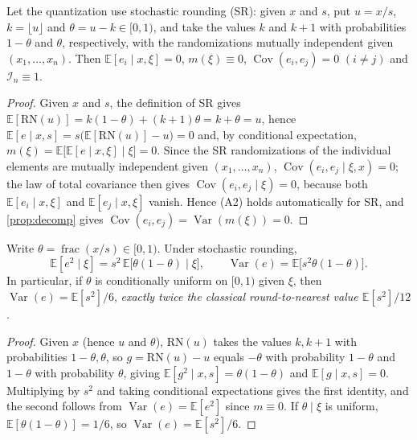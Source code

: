 \documentclass[review,hidelinks,oneeqnum,onetabnum,onefignum,onethmnum]{siamart251216}
\begin{document}
\begin{proposition}
\label{prop:sr}
Let the quantization use stochastic rounding (SR): given $x$ and $s$, put
$u=x/s$, $k=\lfloor u\rfloor$ and $\theta=u-k\in[0,1)$, and take the values
$k$ and $k+1$ with probabilities $1-\theta$ and $\theta$, respectively, with
the randomizations mutually independent given $(x_1,\dots,x_n)$. Then
$\mathbb{E}[e_i\mid x,\xi]=0$, $m(\xi)\equiv0$,
$\operatorname{Cov}(e_i,e_j)=0$ $(i\ne j)$ and $\mathcal I_n\equiv1$.
\end{proposition}

\begin{proof}
Given $x$ and $s$, the definition of SR gives
$\mathbb{E}[\mathrm{RN}(u)]=k(1-\theta)+(k+1)\theta=k+\theta=u$, hence
$\mathbb{E}[e\mid x,s]=s\bigl(\mathbb{E}[\mathrm{RN}(u)]-u\bigr)=0$ and, by
conditional expectation,
$m(\xi)=\mathbb{E}\bigl[\mathbb{E}[e\mid x,\xi]\mid\xi\bigr]=0$. Since the SR
randomizations of the individual elements are mutually independent given
$(x_1,\dots,x_n)$, $\operatorname{Cov}(e_i,e_j\mid\xi,x)=0$; the law of total
covariance then gives $\operatorname{Cov}(e_i,e_j\mid\xi)=0$, because both
$\mathbb{E}[e_i\mid x,\xi]$ and $\mathbb{E}[e_j\mid x,\xi]$ vanish. Hence (A2)
holds automatically for SR, and \cref{prop:decomp} gives
$\operatorname{Cov}(e_i,e_j)=\operatorname{Var}(m(\xi))=0$.
\end{proof}

\begin{corollary}
\label{cor:srvar}
Write $\theta=\operatorname{frac}(x/s)\in[0,1)$. Under stochastic rounding,
\begin{equation}
\mathbb{E}[e^2\mid\xi]=s^2\,\mathbb{E}\bigl[\theta(1-\theta)\mid\xi\bigr],
\qquad
\operatorname{Var}(e)=\mathbb{E}\bigl[s^2\theta(1-\theta)\bigr].
\label{eq:srvar}
\end{equation}
In particular, if $\theta$ is conditionally uniform on $[0,1)$ given $\xi$, then
$\operatorname{Var}(e)=\mathbb{E}[s^2]/6$, \emph{exactly twice the classical
round-to-nearest value $\mathbb{E}[s^2]/12$}.
\end{corollary}

\begin{proof}
Given $x$ (hence $u$ and $\theta$), $\mathrm{RN}(u)$ takes the values $k,k+1$ with
probabilities $1-\theta,\theta$, so $g=\mathrm{RN}(u)-u$ equals $-\theta$ with
probability $1-\theta$ and $1-\theta$ with probability $\theta$, giving
$\mathbb{E}[g^2\mid x,s]=\theta(1-\theta)$ and $\mathbb{E}[g\mid x,s]=0$.
Multiplying by $s^2$ and taking conditional expectations gives the first
identity, and the second follows from $\operatorname{Var}(e)=\mathbb{E}[e^2]$
since $m\equiv0$. If $\theta\mid\xi$ is uniform,
$\mathbb{E}[\theta(1-\theta)]=1/6$, so $\operatorname{Var}(e)=\mathbb{E}[s^2]/6$.
\end{proof}
\end{document}
